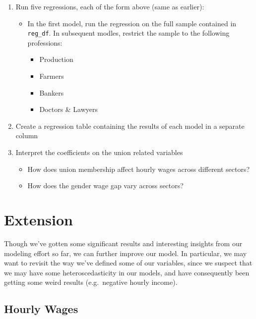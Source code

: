 \documentclass[
  letterpaper,
  DIV=11,
  numbers=noendperiod]{scrreprt}
\providecommand{\tightlist}{%
  \setlength{\itemsep}{0pt}\setlength{\parskip}{0pt}}\usepackage{longtable,booktabs,array}
\begin{document}
\begin{enumerate}
\def\labelenumi{\arabic{enumi}.}
\tightlist
\item
  Run five regressions, each of the form above (same as earlier):

  \begin{itemize}
  \tightlist
  \item
    In the first model, run the regression on the full sample contained
    in \texttt{reg\_df}. In subsequent modles, restrict the sample to
    the following professions:

    \begin{itemize}
    \tightlist
    \item
      Production
    \item
      Farmers
    \item
      Bankers
    \item
      Doctors \& Lawyers
    \end{itemize}
  \end{itemize}
\item
  Create a regression table containing the results of each model in a
  separate column
\item
  Interpret the coefficients on the union related variables

  \begin{itemize}
  \tightlist
  \item
    How does union membership affect hourly wages across different
    sectors?
  \item
    How does the gender wage gap vary across sectors?
  \end{itemize}
\end{enumerate}

\hypertarget{extension-2}{%
\section{Extension}\label{extension-2}}

Though we've gotten some significant results and interesting insights
from our modeling effort so far, we can further improve our model. In
particular, we may want to revisit the way we've defined some of our
variables, since we suspect that we may have some heteroscedasticity in
our models, and have consequently been getting some weird results
(e.g.~negative hourly income).

\hypertarget{hourly-wages}{%
\subsection{Hourly Wages}\label{hourly-wages}}
\end{document}
